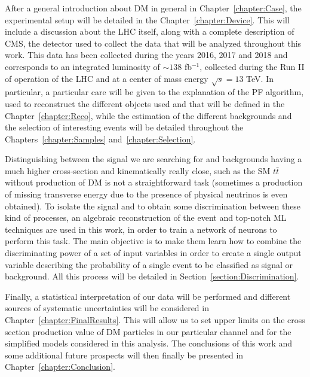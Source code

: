 \documentclass[a4paper, 10pt, openright]{report}
\begin{document}
After a general introduction about \ac{DM} in general in Chapter~\ref{chapter:Case}, the experimental setup will be detailed in the Chapter~\ref{chapter:Device}. This will include a discussion about the \ac{LHC} itself, along with a complete description of \ac{CMS}, the detector used to collect the data that will be analyzed throughout this work. This data has been collected during the years 2016, 2017 and 2018 and corresponds to an integrated luminosity of $\sim 138$ fb$^{-1}$, collected during the Run II of operation of the \ac{LHC} and at a center of mass energy $\sqrt{s} = 13$ TeV. In particular, a particular care will be given to the explanation of the \acf{PF} algorithm, used to reconstruct the different objects used and that will be defined in the Chapter~\ref{chapter:Reco}, while the estimation of the different backgrounds and the selection of interesting events will be detailed throughout the Chapters~\ref{chapter:Samples} and~\ref{chapter:Selection}.

Distinguishing between the signal we are searching for and backgrounds having a much higher cross-section and kinematically really close, such as the \ac{SM} $t \bar t$ without production of \ac{DM} is not a straightforward task (sometimes a production of missing transverse energy due to the presence of physical neutrinos is even obtained). To isolate the signal and to obtain some discrimination between these kind of processes, an algebraic reconstruction of the event and top-notch \ac{ML} techniques are used in this work, in order to train a network of neurons to perform this task. The main objective is to make them learn how to combine the discriminating power of a set of input variables in order to create a single output variable describing the probability of a single event to be classified as signal or background. All this process will be detailed in Section~\ref{section:Discrimination}.

Finally, a statistical interpretation of our data will be performed and different sources of systematic uncertainties will be considered in Chapter~\ref{chapter:FinalResults}. This will allow us to set upper limits on the cross section production value of \ac{DM} particles in our particular channel and for the simplified models considered in this analysis. The conclusions of this work and some additional future prospects will then finally be presented in Chapter~\ref{chapter:Conclusion}.
\\


\end{document}
